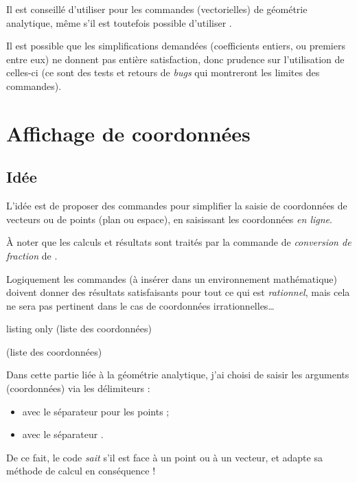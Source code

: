 \documentclass[a4paper,french,11pt]{article}
\newcommand\ctex[1]{\tcbox[vignettelatex]{#1}}
\newcommand\cmaj[1]{%
	{\tcbox[vignetteMaJ]{#1}\xspace}%
}
\begin{document}
\begin{warningblock}
\cmaj{2.6.5} Il est conseillé d'utiliser  pour les commandes (vectorielles) de géométrie analytique, même s'il est toutefois possible d'utiliser .

\smallskip

Il est possible que les simplifications demandées (coefficients entiers, ou premiers entre eux) ne donnent pas entière satisfaction, donc prudence sur l'utilisation de celles-ci (ce sont des tests et retours de \textit{bugs} qui montreront les limites des commandes).
\end{warningblock}

\section{Affichage de coordonnées}\label{affcoord}

\subsection{Idée}

\begin{tipblock}
\cmaj{2.6.4} L'idée est de proposer des commandes pour simplifier la saisie de coordonnées de vecteurs ou de points (plan ou espace), en saisissant les coordonnées \textit{en ligne}.

\smallskip

À noter que les calculs et résultats sont traités par la commande de \textit{conversion de fraction} de \ctex{ProfLycee}.
\end{tipblock}

\begin{warningblock}
Logiquement les commandes (à insérer dans un environnement mathématique) doivent donner des résultats satisfaisants pour tout ce qui est \textit{rationnel}, mais cela ne sera pas pertinent dans le cas de coordonnées irrationnelles\ldots
\end{warningblock}

\begin{PresCodeTexPL}{listing only}
(liste des coordonnées)

(liste des coordonnées)
\end{PresCodeTexPL}

\begin{warningblock}
Dans cette partie liée à la géométrie analytique, j'ai choisi de saisir les arguments (coordonnées) via les délimiteurs \ctex{(...)} :

\begin{itemize}
	\item avec le séparateur \ctex{,} pour les points ;
	\item avec le séparateur \ctex{;}.
\end{itemize}

De ce fait, le code \textit{sait} s'il est face à un point ou à un vecteur, et adapte sa méthode de calcul en conséquence !
\end{warningblock}
\end{document}
